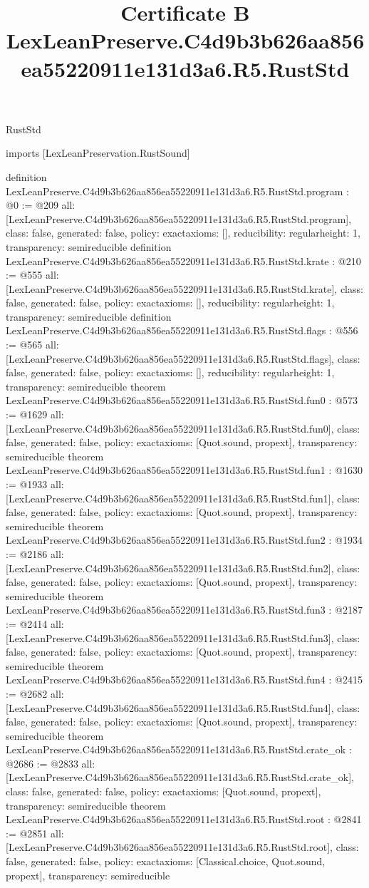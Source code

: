 \begin{lexlean}{RustStd}
\title{Certificate B LexLeanPreserve.C4d9b3b626aa856ea55220911e131d3a6.R5.RustStd}
\begin{coremodule}
imports [LexLeanPreservation.RustSound]

definition LexLeanPreserve.C4d9b3b626aa856ea55220911e131d3a6.R5.RustStd.program : @0 := @209 {
  all: [LexLeanPreserve.C4d9b3b626aa856ea55220911e131d3a6.R5.RustStd.program],
  class: false,
  generated: false,
  policy: exact{axioms: []},
  reducibility: regular{height: 1},
  transparency: semireducible
}
definition LexLeanPreserve.C4d9b3b626aa856ea55220911e131d3a6.R5.RustStd.krate : @210 := @555 {
  all: [LexLeanPreserve.C4d9b3b626aa856ea55220911e131d3a6.R5.RustStd.krate],
  class: false,
  generated: false,
  policy: exact{axioms: []},
  reducibility: regular{height: 1},
  transparency: semireducible
}
definition LexLeanPreserve.C4d9b3b626aa856ea55220911e131d3a6.R5.RustStd.flags : @556 := @565 {
  all: [LexLeanPreserve.C4d9b3b626aa856ea55220911e131d3a6.R5.RustStd.flags],
  class: false,
  generated: false,
  policy: exact{axioms: []},
  reducibility: regular{height: 1},
  transparency: semireducible
}
theorem LexLeanPreserve.C4d9b3b626aa856ea55220911e131d3a6.R5.RustStd.fun0 : @573 := @1629 {
  all: [LexLeanPreserve.C4d9b3b626aa856ea55220911e131d3a6.R5.RustStd.fun0],
  class: false,
  generated: false,
  policy: exact{axioms: [Quot.sound, propext]},
  transparency: semireducible
}
theorem LexLeanPreserve.C4d9b3b626aa856ea55220911e131d3a6.R5.RustStd.fun1 : @1630 := @1933 {
  all: [LexLeanPreserve.C4d9b3b626aa856ea55220911e131d3a6.R5.RustStd.fun1],
  class: false,
  generated: false,
  policy: exact{axioms: [Quot.sound, propext]},
  transparency: semireducible
}
theorem LexLeanPreserve.C4d9b3b626aa856ea55220911e131d3a6.R5.RustStd.fun2 : @1934 := @2186 {
  all: [LexLeanPreserve.C4d9b3b626aa856ea55220911e131d3a6.R5.RustStd.fun2],
  class: false,
  generated: false,
  policy: exact{axioms: [Quot.sound, propext]},
  transparency: semireducible
}
theorem LexLeanPreserve.C4d9b3b626aa856ea55220911e131d3a6.R5.RustStd.fun3 : @2187 := @2414 {
  all: [LexLeanPreserve.C4d9b3b626aa856ea55220911e131d3a6.R5.RustStd.fun3],
  class: false,
  generated: false,
  policy: exact{axioms: [Quot.sound, propext]},
  transparency: semireducible
}
theorem LexLeanPreserve.C4d9b3b626aa856ea55220911e131d3a6.R5.RustStd.fun4 : @2415 := @2682 {
  all: [LexLeanPreserve.C4d9b3b626aa856ea55220911e131d3a6.R5.RustStd.fun4],
  class: false,
  generated: false,
  policy: exact{axioms: [Quot.sound, propext]},
  transparency: semireducible
}
theorem LexLeanPreserve.C4d9b3b626aa856ea55220911e131d3a6.R5.RustStd.crate_ok : @2686 := @2833 {
  all: [LexLeanPreserve.C4d9b3b626aa856ea55220911e131d3a6.R5.RustStd.crate_ok],
  class: false,
  generated: false,
  policy: exact{axioms: [Quot.sound, propext]},
  transparency: semireducible
}
theorem LexLeanPreserve.C4d9b3b626aa856ea55220911e131d3a6.R5.RustStd.root : @2841 := @2851 {
  all: [LexLeanPreserve.C4d9b3b626aa856ea55220911e131d3a6.R5.RustStd.root],
  class: false,
  generated: false,
  policy: exact{axioms: [Classical.choice, Quot.sound, propext]},
  transparency: semireducible
}


\end{coremodule}
\end{lexlean}
